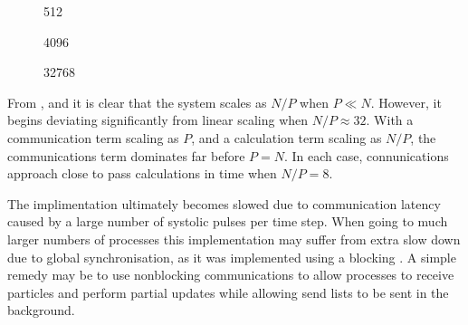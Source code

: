 %
%
\begin{figure}[!h]
    
    \caption{
        \vZeroTimeCaption
            {\systolicloop{}}
            {\pairoperation{}}
            {512}
    }
    \label{fig:v0_systolic_pair_operation_512_logtime}
\end  {figure}

\begin{figure}[!h]
    
    \caption{
        \vZeroTimeCaption
        {\systolicloop{}}
        {\pairoperation{}}
        {4096}
    }
    \label{fig:v0_systolic_pair_operation_4096_logtime}
\end  {figure}

\begin{figure}[!h]
    
    \caption{
        \vZeroTimeCaption
            {\systolicloop{}}
            {\pairoperation{}}
            {32768}
    }
    \label{fig:v0_systolic_pair_operation_32768_logtime}
\end  {figure}

\vZeroTimeExplanation
{}
{}
{}
{\pairoperation{}}
{\systolicloop{}}

%
From
,
 and
it is clear that the system scales as $N/P$ when $P \ll{} N$.
%
However, it begins deviating significantly from linear scaling
when $N/P \approx{} 32$.
%
With a communication term scaling as $P$, and a calculation term
scaling as $N/P$, the communications term dominates far before $P = N$.
%
In each case, connunications approach close to pass calculations in time
when $N/P = 8$.

The implimentation ultimately becomes slowed due to
communication latency caused by a large number
of systolic pulses per time step.
%
When going to much larger numbers of processes
this implementation may suffer from extra slow down due to
global synchronisation, as it was implemented using a blocking
\mpisendrecv{}.
%
A simple remedy may be to use nonblocking communications to allow
processes to receive particles and perform partial updates while
allowing send lists to be sent in the background.
